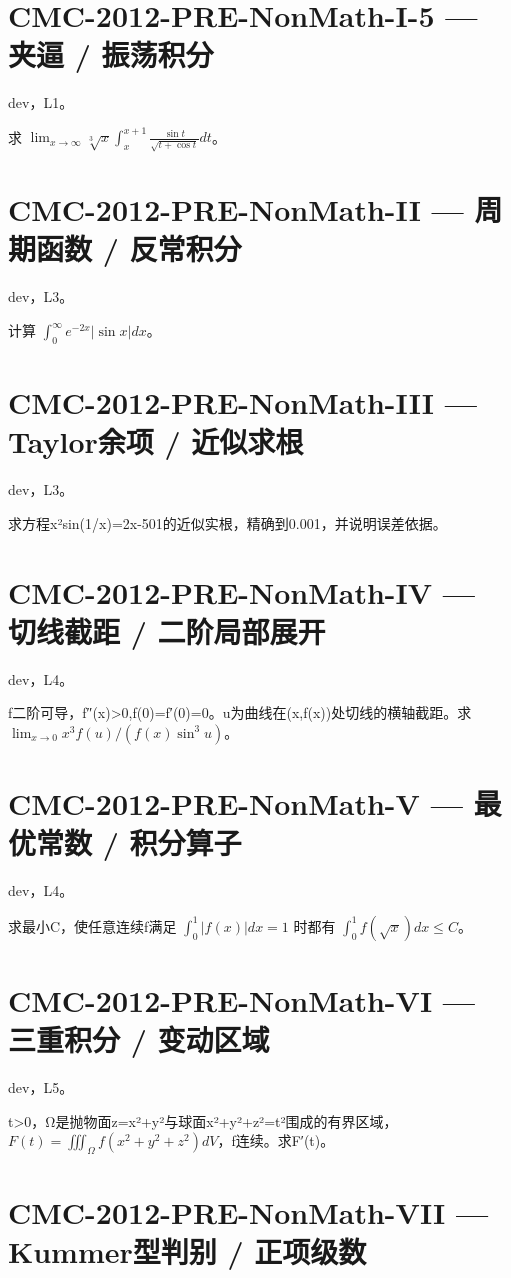 \documentclass[UTF8]{ctexart}
\begin{document}
\section*{CMC-2012-PRE-NonMath-I-5 — 夹逼 / 振荡积分}

dev，L1。

求 $\lim_{x\to\infty}\sqrt[3]x\int_x^{x+1}\frac{\sin t}{\sqrt{t+\cos t}}dt$。

\section*{CMC-2012-PRE-NonMath-II — 周期函数 / 反常积分}

dev，L3。

计算 $\int_0^\infty e^{-2x}|\sin x|dx$。

\section*{CMC-2012-PRE-NonMath-III — Taylor余项 / 近似求根}

dev，L3。

求方程x²sin(1/x)=2x-501的近似实根，精确到0.001，并说明误差依据。

\section*{CMC-2012-PRE-NonMath-IV — 切线截距 / 二阶局部展开}

dev，L4。

f二阶可导，f″(x)>0,f(0)=f′(0)=0。u为曲线在(x,f(x))处切线的横轴截距。求 $\lim_{x\to0}x^3f(u)/(f(x)\sin^3u)$。

\section*{CMC-2012-PRE-NonMath-V — 最优常数 / 积分算子}

dev，L4。

求最小C，使任意连续f满足 $\int_0^1|f(x)|dx=1$ 时都有 $\int_0^1f(\sqrt x)dx\le C$。

\section*{CMC-2012-PRE-NonMath-VI — 三重积分 / 变动区域}

dev，L5。

t>0，Ω是抛物面z=x²+y²与球面x²+y²+z²=t²围成的有界区域，$F(t)=\iiint_\Omega f(x^2+y^2+z^2)dV$，f连续。求F′(t)。

\section*{CMC-2012-PRE-NonMath-VII — Kummer型判别 / 正项级数}
\end{document}
